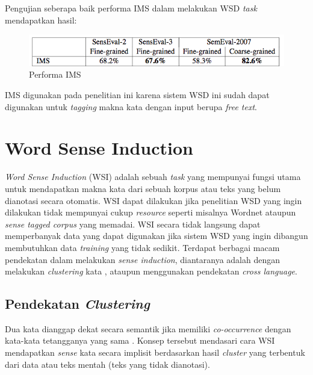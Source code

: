 Pengujian seberapa baik performa IMS dalam melakukan  WSD \textit{task} mendapatkan hasil:

\begin{figure}
	\centering
	\includegraphics[width=1\linewidth]{adit_pics/Performa-IMS}
	\caption{Performa IMS \citep{zhong2010makes}}
	\label{fig:Performa-IMS}
\end{figure}

IMS digunakan pada penelitian ini karena sistem WSD ini sudah dapat digunakan untuk \textit{tagging} makna kata dengan input berupa \textit{free text}.

\section{Word Sense Induction}
\textit{Word Sense Induction} (WSI) adalah sebuah \textit{task} yang mempunyai fungsi utama untuk mendapatkan makna kata dari sebuah korpus atau teks yang belum dianotasi secara otomatis. WSI dapat dilakukan jika penelitian WSD yang ingin dilakukan tidak mempunyai cukup \textit{resource} seperti misalnya Wordnet ataupun \textit{sense tagged corpus} yang memadai. WSI secara tidak langsung dapat memperbanyak data yang dapat digunakan jika sistem WSD yang ingin dibangun membutuhkan data \textit{training} yang tidak sedikit. Terdapat berbagai macam pendekatan dalam melakukan \textit{sense induction}, diantaranya adalah dengan melakukan \textit{clustering} kata \citep{denkowski2009survey}, ataupun menggunakan pendekatan \textit{cross language}.
	
	\subsection{Pendekatan \textit{Clustering}}
	Dua kata dianggap dekat secara semantik jika memiliki \textit{co-occurrence} dengan kata-kata tetangganya yang sama \citep{nasiruddin2013state}. Konsep tersebut mendasari cara WSI mendapatkan \textit{sense} kata secara implisit berdasarkan hasil \textit{cluster} yang terbentuk dari data atau teks mentah (teks yang tidak dianotasi).
	
